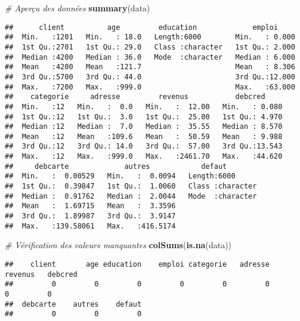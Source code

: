 \documentclass[
]{article}
\newenvironment{Shaded}{\begin{snugshade}}{\end{snugshade}}
\newcommand{\CommentTok}[1]{\textcolor[rgb]{0.56,0.35,0.01}{\textit{#1}}}
\newcommand{\FunctionTok}[1]{\textcolor[rgb]{0.13,0.29,0.53}{\textbf{#1}}}
\newcommand{\NormalTok}[1]{#1}
\begin{document}
\begin{Shaded}
\begin{Highlighting}[]
\CommentTok{\# Aperçu des données}
\FunctionTok{summary}\NormalTok{(data)}
\end{Highlighting}
\end{Shaded}

\begin{verbatim}
##      client          age         education             emploi      
##  Min.   :1201   Min.   : 18.0   Length:6000        Min.   : 0.000  
##  1st Qu.:2701   1st Qu.: 29.0   Class :character   1st Qu.: 2.000  
##  Median :4200   Median : 36.0   Mode  :character   Median : 6.000  
##  Mean   :4200   Mean   :121.7                      Mean   : 8.306  
##  3rd Qu.:5700   3rd Qu.: 44.0                      3rd Qu.:12.000  
##  Max.   :7200   Max.   :999.0                      Max.   :63.000  
##    categorie     adresse         revenus           debcred      
##  Min.   :12   Min.   :  0.0   Min.   :  12.00   Min.   : 0.080  
##  1st Qu.:12   1st Qu.:  3.0   1st Qu.:  25.00   1st Qu.: 4.970  
##  Median :12   Median :  7.0   Median :  35.55   Median : 8.570  
##  Mean   :12   Mean   :109.6   Mean   :  50.59   Mean   : 9.988  
##  3rd Qu.:12   3rd Qu.: 14.0   3rd Qu.:  57.00   3rd Qu.:13.543  
##  Max.   :12   Max.   :999.0   Max.   :2461.70   Max.   :44.620  
##     debcarte             autres            defaut         
##  Min.   :  0.00529   Min.   :  0.0094   Length:6000       
##  1st Qu.:  0.39847   1st Qu.:  1.0060   Class :character  
##  Median :  0.91762   Median :  2.0044   Mode  :character  
##  Mean   :  1.69715   Mean   :  3.3596                     
##  3rd Qu.:  1.89987   3rd Qu.:  3.9147                     
##  Max.   :139.58061   Max.   :416.5174
\end{verbatim}

\begin{Shaded}
\begin{Highlighting}[]
\CommentTok{\# Vérification des valeurs manquantes}
\FunctionTok{colSums}\NormalTok{(}\FunctionTok{is.na}\NormalTok{(data))}
\end{Highlighting}
\end{Shaded}

\begin{verbatim}
##    client       age education    emploi categorie   adresse   revenus   debcred 
##         0         0         0         0         0         0         0         0 
##  debcarte    autres    defaut 
##         0         0         0
\end{verbatim}
\end{document}
